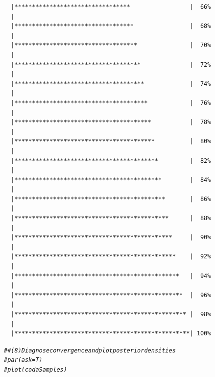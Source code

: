 \documentclass{article}\usepackage[]{graphicx}\usepackage[]{color}
\makeatletter
\newcommand{\hlcom}[1]{\textcolor[rgb]{0.678,0.584,0.686}{\textit{#1}}}%
\newenvironment{kframe}{%
 \def\at@end@of@kframe{}%
 \ifinner\ifhmode%
  \def\at@end@of@kframe{\end{minipage}}%
  \begin{minipage}{\columnwidth}%
 \fi\fi%
 \def\FrameCommand##1{\hskip\@totalleftmargin \hskip-\fboxsep
 \colorbox{shadecolor}{##1}\hskip-\fboxsep
     \hskip-\linewidth \hskip-\@totalleftmargin \hskip\columnwidth}%
 \MakeFramed {\advance\hsize-\width
   \@totalleftmargin\z@ \linewidth\hsize
   \@setminipage}}%
 {\par\unskip\endMakeFramed%
 \at@end@of@kframe}
\newenvironment{knitrout}{}{} %
\makeatother
\begin{document}
\begin{knitrout}
\begin{kframe}
\begin{verbatim}
  |*********************************                 |  66%
  |                                                        
  |**********************************                |  68%
  |                                                        
  |***********************************               |  70%
  |                                                        
  |************************************              |  72%
  |                                                        
  |*************************************             |  74%
  |                                                        
  |**************************************            |  76%
  |                                                        
  |***************************************           |  78%
  |                                                        
  |****************************************          |  80%
  |                                                        
  |*****************************************         |  82%
  |                                                        
  |******************************************        |  84%
  |                                                        
  |*******************************************       |  86%
  |                                                        
  |********************************************      |  88%
  |                                                        
  |*********************************************     |  90%
  |                                                        
  |**********************************************    |  92%
  |                                                        
  |***********************************************   |  94%
  |                                                        
  |************************************************  |  96%
  |                                                        
  |************************************************* |  98%
  |                                                        
  |**************************************************| 100%
\end{verbatim}
\begin{alltt}
\hlcom{## (8) Diagnose convergence and plot posterior densities}
\hlcom{# par(ask=T)}
\hlcom{# plot(codaSamples)}


\end{alltt}
\end{kframe}
\end{knitrout}
\end{document}
